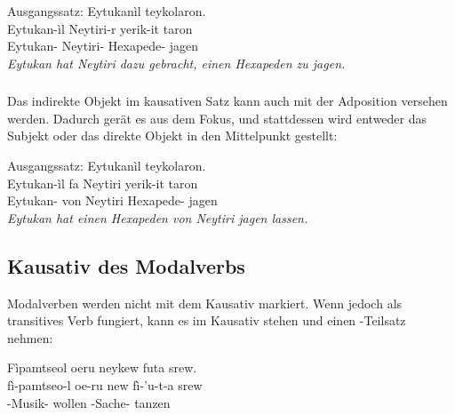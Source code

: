\begin{interlin}
	Ausgangssatz:  
	\glll \Npawl{}Eytukanìl   teykolaron. \\
	Eytukan-ìl Neytiri-r yerik-it taron \\
	Eytukan- Neytiri- Hexapede- jagen \\
	\vskip-4pt\textit{Eytukan hat Neytiri dazu gebracht, einen Hexapeden zu jagen.}
\end{interlin}

\subsubsection{} Das indirekte Objekt im kausativen Satz kann auch mit der Adposition   versehen werden. Dadurch gerät es aus dem Fokus, und stattdessen wird entweder das Subjekt oder das direkte Objekt in den Mittelpunkt gestellt: 

\begin{interlin}
	Ausgangssatz:  
	\glll \Npawl{}Eytukanìl    teykolaron. \\
	Eytukan-ìl fa Neytiri yerik-it taron \\
	Eytukan- von Neytiri Hexapede- jagen \\
	\vskip-4pt\textit{Eytukan hat einen Hexapeden von Neytiri jagen lassen.}
\end{interlin}

\subsection{Kausativ des Modalverbs} 
Modalverben werden nicht mit dem Kausativ markiert. Wenn jedoch   als transitives Verb fungiert, kann es im Kausativ stehen und einen -Teilsatz nehmen: 

\begin{interlin}
	\glll \Npawl{}Fìpamtseol oeru neykew futa srew. \\
	fì-pamtseo-l oe-ru new fì-'u-t-a srew \\
	-Musik-  wollen -Sache- tanzen \\
\end{interlin}

